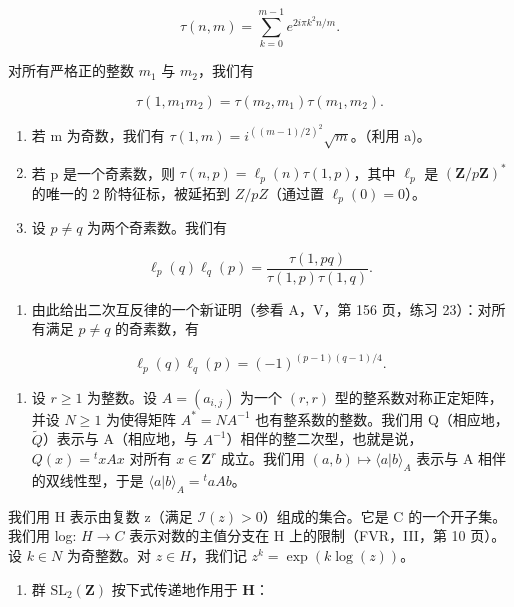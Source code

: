 \[
\tau (n, m) = \sum_ {k = 0} ^ {m - 1} e ^ {2 i \pi k ^ {2} n / m}.
\]

对所有严格正的整数 \(m_{1}\) 与 \(m_{2}\)，我们有

\[
\tau (1, m _ {1} m _ {2}) = \tau (m _ {2}, m _ {1}) \tau (m _ {1}, m _ {2}).
\]

\begin{enumerate}
\def\labelenumi{\alph{enumi})}
\setcounter{enumi}{3}
\item
  若 m 为奇数，我们有 \(\tau(1,m)=i^{((m-1)/2)^{2}}\sqrt{m}\)。（利用 a)。
\item
  若 p 是一个奇素数，则 \(\tau(n,p)=\ell_{p}(n)\tau(1,p)\)，其中 \(\ell_{p}\) 是 \((\mathbf{Z}/p\mathbf{Z})^{*}\) 的唯一的 2 阶特征标，被延拓到 \(Z/pZ\)（通过置 \(\ell_{p}(0)=0\)）。
\item
  设 \(p \neq q\) 为两个奇素数。我们有
\end{enumerate}

\[
\ell_ {p} (q) \ell_ {q} (p) = \frac {\tau (1 , p q)}{\tau (1 , p) \tau (1 , q)}.
\]

\begin{enumerate}
\def\labelenumi{\alph{enumi})}
\setcounter{enumi}{6}
\tightlist
\item
  由此给出二次互反律的一个新证明（参看 A，V，第 156 页，练习 23）：对所有满足 \(p \neq q\) 的奇素数，有
\end{enumerate}

\[
\ell_ {p} (q) \ell_ {q} (p) = (- 1) ^ {(p - 1) (q - 1) / 4}.
\]

\begin{enumerate}
\def\labelenumi{\arabic{enumi})}
\setcounter{enumi}{60}
\tightlist
\item
  设 \(r \geqslant 1\) 为整数。设 \(A = (a_{i,j})\) 为一个 \((r, r)\) 型的整系数对称正定矩阵，并设 \(N \geqslant 1\) 为使得矩阵 \(A^* = NA^{-1}\) 也有整系数的整数。我们用 Q（相应地，\(\widetilde{Q}\)）表示与 A（相应地，与 \(A^{-1}\)）相伴的整二次型，也就是说，\(Q(x) = {}^t xAx\) 对所有 \(x \in \mathbf{Z}^r\) 成立。我们用 \((a, b) \mapsto \langle a|b \rangle_A\) 表示与 A 相伴的双线性型，于是 \(\langle a|b \rangle_A = {}^t aAb\)。
\end{enumerate}

我们用 H 表示由复数 z（满足 \(\mathcal{I}(z)>0\)）组成的集合。它是 C 的一个开子集。我们用 log: \(H\to C\) 表示对数的主值分支在 H 上的限制（FVR，III，第 10 页）。设 \(k\in N\) 为奇整数。对 \(z\in H\)，我们记 \(z^{k}=\exp(k\log(z))\)。

\begin{enumerate}
\def\labelenumi{\alph{enumi})}
\tightlist
\item
  群 \(\mathrm{SL}_2(\mathbf{Z})\) 按下式传递地作用于 \(\mathbf{H}\)：
\end{enumerate}

